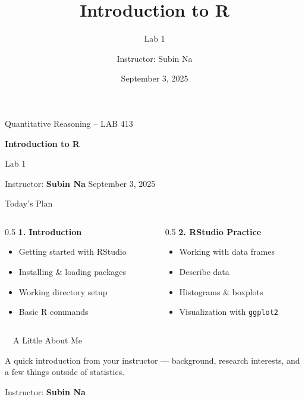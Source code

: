\documentclass[aspectratio=169,11pt]{beamer}
\title{\bfseries Introduction to R}
\subtitle{Lab 1}
\author{Instructor: Subin Na}
\institute{Quantitative Reasoning -- LAB 413}
\date{September 3, 2025}
\begin{document}
{
\begin{frame}
  \vfill
  {\color{qrgray}\small Quantitative Reasoning -- LAB 413}\\[0.6em]
  {\color{qrnavy}\huge\bfseries Introduction to R\par}
  \vspace{0.4em}
  {\color{qrblue}\large Lab 1}\par
  \vspace{1.6em}
  {\color{qrgray} Instructor: \textbf{Subin Na} \hfill September 3, 2025}
  \vfill
\end{frame}
}

\begin{frame}{Today's Plan}
  \begin{columns}[T]
    \begin{column}{0.5\textwidth}
      \textbf{\color{qrnavy}1. Introduction}
      \begin{itemize}
        \item Getting started with RStudio
        \item Installing \& loading packages
        \item Working directory setup
        \item Basic R commands
      \end{itemize}
    \end{column}
    \begin{column}{0.5\textwidth}
      \textbf{\color{qrnavy}2. RStudio Practice}
      \begin{itemize}
        \item Working with data frames
        \item Describe data
        \item Histograms \& boxplots
        \item Visualization with \texttt{ggplot2}
      \end{itemize}
    \end{column}
  \end{columns}
\end{frame}

\begin{frame}{\ \ A Little About Me}
  \begin{keybox}[Introductions]
    A quick introduction from your instructor --- background, research
    interests, and a few things outside of statistics.
  \end{keybox}
  \vspace{0.6em}
  \begin{center}
    {\color{qrgray}\small Instructor: \textbf{Subin Na}}
  \end{center}
\end{frame}
\end{document}
